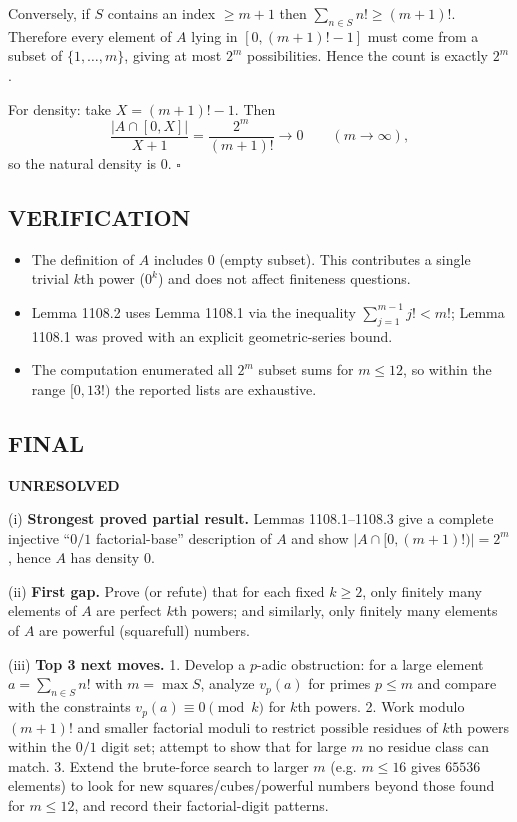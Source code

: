Conversely, if $S$ contains an index $\ge m+1$ then $\sum_{n\in S} n!\ge (m+1)!$.
Therefore every element of $A$ lying in $[0,(m+1)!-1]$ must come from a subset of $\{1,\dots,m\}$, giving at most $2^m$ possibilities.
Hence the count is exactly $2^m$.

For density: take $X=(m+1)!-1$. Then
\[\frac{|A\cap[0,X]|}{X+1} = \frac{2^m}{(m+1)!} \to 0\qquad (m\to\infty),\]
so the natural density is $0$. \hfill $\square$

\subsection*{VERIFICATION}
\begin{itemize}
\item The definition of $A$ includes $0$ (empty subset). This contributes a single trivial $k$th power ($0^k$) and does not affect finiteness questions.
\item Lemma 1108.2 uses Lemma 1108.1 via the inequality $\sum_{j=1}^{m-1} j! < m!$; Lemma 1108.1 was proved with an explicit geometric-series bound.
\item The computation enumerated all $2^m$ subset sums for $m\le 12$, so within the range $[0,13!)$ the reported lists are exhaustive.
\end{itemize}

\subsection*{FINAL}
\textbf{UNRESOLVED}

(i) \textbf{Strongest proved partial result.}
Lemmas 1108.1--1108.3 give a complete injective ``$0/1$ factorial-base'' description of $A$ and show $|A\cap[0,(m+1)! )|=2^m$, hence $A$ has density $0$.

(ii) \textbf{First gap.}
Prove (or refute) that for each fixed $k\ge 2$, only finitely many elements of $A$ are perfect $k$th powers; and similarly, only finitely many elements of $A$ are powerful (squarefull) numbers.

(iii) \textbf{Top 3 next moves.}
1. Develop a $p$-adic obstruction: for a large element $a=\sum_{n\in S}n!$ with $m=\max S$, analyze $v_p(a)$ for primes $p\le m$ and compare with the constraints $v_p(a)\equiv 0\pmod{k}$ for $k$th powers.
2. Work modulo $(m+1)!$ and smaller factorial moduli to restrict possible residues of $k$th powers within the $0/1$ digit set; attempt to show that for large $m$ no residue class can match.
3. Extend the brute-force search to larger $m$ (e.g. $m\le 16$ gives $65536$ elements) to look for new squares/cubes/powerful numbers beyond those found for $m\le 12$, and record their factorial-digit patterns.


